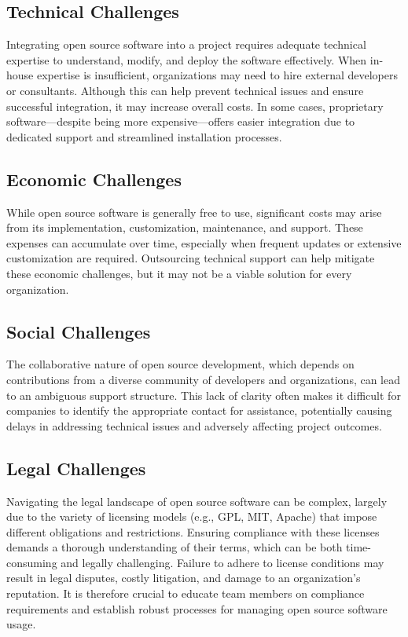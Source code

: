 \cite{OpenSource-Software-Risks-Disadvantages}

\subsection{Technical Challenges}

Integrating open source software into a project requires adequate technical expertise to understand, modify, and deploy the software effectively. When in-house expertise is insufficient, organizations may need to hire external developers or consultants. Although this can help prevent technical issues and ensure successful integration, it may increase overall costs. In some cases, proprietary software—despite being more expensive—offers easier integration due to dedicated support and streamlined installation processes.

\subsection{Economic Challenges}

While open source software is generally free to use, significant costs may arise from its implementation, customization, maintenance, and support. These expenses can accumulate over time, especially when frequent updates or extensive customization are required. Outsourcing technical support can help mitigate these economic challenges, but it may not be a viable solution for every organization.

\subsection{Social Challenges}

The collaborative nature of open source development, which depends on contributions from a diverse community of developers and organizations, can lead to an ambiguous support structure. This lack of clarity often makes it difficult for companies to identify the appropriate contact for assistance, potentially causing delays in addressing technical issues and adversely affecting project outcomes.

\subsection{Legal Challenges}

Navigating the legal landscape of open source software can be complex, largely due to the variety of licensing models (e.g., GPL, MIT, Apache) that impose different obligations and restrictions. Ensuring compliance with these licenses demands a thorough understanding of their terms, which can be both time-consuming and legally challenging. Failure to adhere to license conditions may result in legal disputes, costly litigation, and damage to an organization’s reputation. It is therefore crucial to educate team members on compliance requirements and establish robust processes for managing open source software usage.

